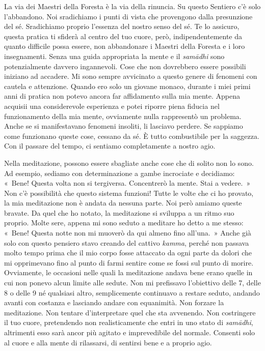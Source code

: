 La via dei Maestri della Foresta è la via della rinuncia. Su questo
Sentiero c'è solo l'abbandono. Noi sradichiamo i punti di vista che
provengono dalla presunzione del sé. Sradichiamo proprio l'essenza del
nostro senso del sé. Te lo assicuro, questa pratica ti sfiderà al centro
del tuo cuore, però, indipendentemente da quanto difficile possa essere,
non abbandonare i Maestri della Foresta e i loro insegnamenti. Senza una
guida appropriata la mente e il \emph{samādhi} sono potenzialmente
davvero ingannevoli. Cose che non dovrebbero essere possibili iniziano
ad accadere. Mi sono sempre avvicinato a questo genere di fenomeni con
cautela e attenzione. Quando ero solo un giovane monaco, durante i miei
primi anni di pratica non potevo ancora far affidamento sulla mia mente.
Appena acquisii una considerevole esperienza e potei riporre piena
fiducia nel funzionamento della mia mente, ovviamente nulla rappresentò
un problema. Anche se si manifestavano fenomeni insoliti, li lasciavo
perdere. Se sappiamo come funzionano queste cose, cessano da sé. È tutto
combustibile per la saggezza. Con il passare del tempo, ci sentiamo
completamente a nostro agio.

Nella meditazione, possono essere sbagliate anche cose che di solito non
lo sono. Ad esempio, sediamo con determinazione a gambe incrociate e
decidiamo: «~Bene! Questa volta non si tergiversa. Concentrerò la mente.
Stai a vedere.~» Non c'è possibilità che questo sistema funzioni! Tutte
le volte che ci ho provato, la mia meditazione non è andata da nessuna
parte. Noi però amiamo queste bravate. Da quel che ho notato, la
meditazione si sviluppa a un ritmo suo proprio. Molte sere, appena mi
sono seduto a meditare ho detto a me stesso: «~Bene! Questa notte non mi
muoverò da qui almeno fino all'una.~» Anche già solo con questo pensiero
stavo creando del cattivo \emph{kamma}, perché non passava molto tempo
prima che il mio corpo fosse attaccato da ogni parte da dolori che mi
opprimevano fino al punto di farmi sentire come se fossi sul punto di
morire. Ovviamente, le occasioni nelle quali la meditazione andava bene
erano quelle in cui non ponevo alcun limite alle sedute. Non mi
prefissavo l'obiettivo delle 7, delle 8 o delle 9 né qualsiasi altro,
semplicemente continuavo a restare seduto, andando avanti con costanza e
lasciando andare con equanimità. Non forzare la meditazione. Non tentare
d'interpretare quel che sta avvenendo. Non costringere il tuo cuore,
pretendendo non realisticamente che entri in uno stato di
\emph{samādhi}, altrimenti esso sarà ancor più agitato e imprevedibile
del normale. Consenti solo al cuore e alla mente di rilassarsi, di
sentirsi bene e a proprio agio.

